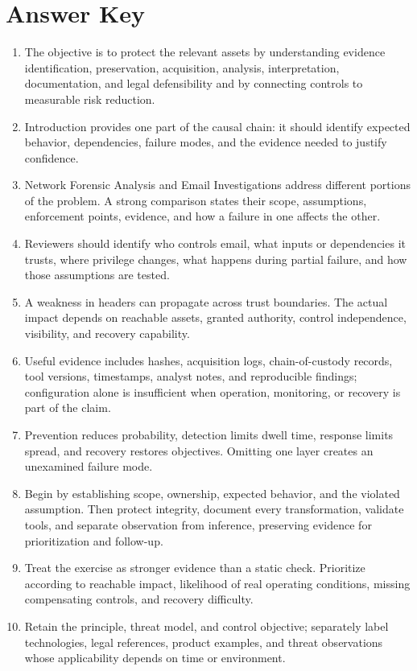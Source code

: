 \documentclass[11pt]{article}
\begin{document}
\section*{Answer Key}
\begin{enumerate}
\item The objective is to protect the relevant assets by understanding evidence identification, preservation, acquisition, analysis, interpretation, documentation, and legal defensibility and by connecting controls to measurable risk reduction.
\item Introduction provides one part of the causal chain: it should identify expected behavior, dependencies, failure modes, and the evidence needed to justify confidence.
\item Network Forensic Analysis and Email Investigations address different portions of the problem. A strong comparison states their scope, assumptions, enforcement points, evidence, and how a failure in one affects the other.
\item Reviewers should identify who controls email, what inputs or dependencies it trusts, where privilege changes, what happens during partial failure, and how those assumptions are tested.
\item A weakness in headers can propagate across trust boundaries. The actual impact depends on reachable assets, granted authority, control independence, visibility, and recovery capability.
\item Useful evidence includes hashes, acquisition logs, chain-of-custody records, tool versions, timestamps, analyst notes, and reproducible findings; configuration alone is insufficient when operation, monitoring, or recovery is part of the claim.
\item Prevention reduces probability, detection limits dwell time, response limits spread, and recovery restores objectives. Omitting one layer creates an unexamined failure mode.
\item Begin by establishing scope, ownership, expected behavior, and the violated assumption. Then protect integrity, document every transformation, validate tools, and separate observation from inference, preserving evidence for prioritization and follow-up.
\item Treat the exercise as stronger evidence than a static check. Prioritize according to reachable impact, likelihood of real operating conditions, missing compensating controls, and recovery difficulty.
\item Retain the principle, threat model, and control objective; separately label technologies, legal references, product examples, and threat observations whose applicability depends on time or environment.
\end{enumerate}
\end{document}
